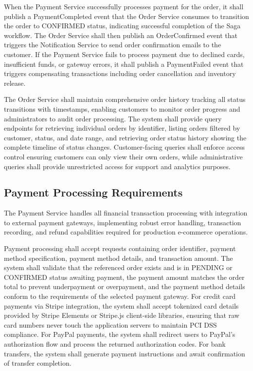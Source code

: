 When the Payment Service successfully processes payment for the order, it shall publish a PaymentCompleted event that the Order Service consumes to transition the order to CONFIRMED status, indicating successful completion of the Saga workflow. The Order Service shall then publish an OrderConfirmed event that triggers the Notification Service to send order confirmation emails to the customer. If the Payment Service fails to process payment due to declined cards, insufficient funds, or gateway errors, it shall publish a PaymentFailed event that triggers compensating transactions including order cancellation and inventory release.

The Order Service shall maintain comprehensive order history tracking all status transitions with timestamps, enabling customers to monitor order progress and administrators to audit order processing. The system shall provide query endpoints for retrieving individual orders by identifier, listing orders filtered by customer, status, and date range, and retrieving order status history showing the complete timeline of status changes. Customer-facing queries shall enforce access control ensuring customers can only view their own orders, while administrative queries shall provide unrestricted access for support and analytics purposes.

\subsection{Payment Processing Requirements}

The Payment Service handles all financial transaction processing with integration to external payment gateways, implementing robust error handling, transaction recording, and refund capabilities required for production e-commerce operations.

Payment processing shall accept requests containing order identifier, payment method specification, payment method details, and transaction amount. The system shall validate that the referenced order exists and is in PENDING or CONFIRMED status awaiting payment, the payment amount matches the order total to prevent underpayment or overpayment, and the payment method details conform to the requirements of the selected payment gateway. For credit card payments via Stripe integration, the system shall accept tokenized card details provided by Stripe Elements or Stripe.js client-side libraries, ensuring that raw card numbers never touch the application servers to maintain PCI DSS compliance. For PayPal payments, the system shall redirect users to PayPal's authorization flow and process the returned authorization codes. For bank transfers, the system shall generate payment instructions and await confirmation of transfer completion.

